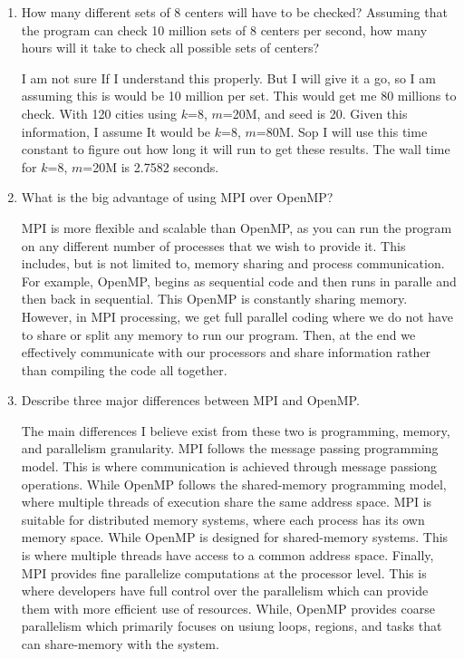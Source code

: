\documentclass[12pt]{article}
\begin{document}
\begin{enumerate}
\item How many different sets of 8 centers will have to be checked? Assuming that the program can check 10 million sets of 8 centers per second, how many hours will it take to check all possible sets of centers?

I am not sure If I understand this properly. But I will give it a go, so I am assuming this is would be 10 million per set. This would get me 80 millions to check. With 120 cities using $k$=8, $m$=20M, and seed is 20. Given this information, I assume It would be $k$=8, $m$=80M. Sop I will use this time constant to figure out how long it will run to get these results. The wall time for $k$=8, $m$=20M is 2.7582 seconds. 

\item What is the big advantage of using MPI over OpenMP?

MPI is more flexible and scalable than OpenMP, as you can run the program on any different number of processes that we wish to provide it. This includes, but is not limited to, memory sharing and process communication. For example, OpenMP, begins as sequential code and then runs in paralle and then back in sequential. This OpenMP is constantly sharing memory. However, in MPI processing, we get full parallel coding where we do not have to share or split any memory to run our program. Then, at the end we effectively communicate with our processors and share information rather than compiling the code all together.

\item Describe three major differences between MPI and OpenMP.

The main differences I believe exist from these two is programming, memory, and parallelism granularity. MPI follows the message passing programming model. This is where communication is achieved through message passiong operations. While OpenMP follows the shared-memory programming model, where multiple threads of execution share the same address space. MPI is suitable for distributed memory systems, where each process has its own memory space. While OpenMP is designed for shared-memory systems. This is where multiple threads have access to a common address space. Finally, MPI provides fine parallelize computations at the processor level. This is where developers have full control over the parallelism which can provide them with more efficient use of resources. While, OpenMP provides coarse parallelism which primarily focuses on usiung loops, regions, and tasks that can share-memory with the system.


\end{enumerate}
\end{document}
